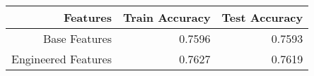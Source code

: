 \begin{tabular}{|r||r|r|}
\hline
Features & Train Accuracy & Test Accuracy \\
\hline
Base Features & 0.7596 & 0.7593 \\
Engineered Features & 0.7627 & 0.7619 \\
\hline
\end{tabular}
